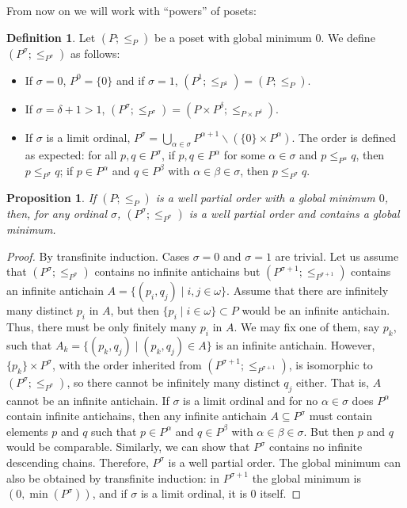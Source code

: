\documentclass[reqno]{amsart}
\newtheorem{proposition}[theorem]{Proposition}
\theoremstyle{definition}
\theoremstyle{definition}
\newtheorem{definition}[theorem]{Definition}
\theoremstyle{plain} %
\begin{document}
From now on we will work with ``powers'' of posets:
\begin{definition}\label{defpow}
    Let $(P;\leq_P)$ be a poset with global minimum $0$. We define $(P^\sigma;\leq_{P^\sigma})$ as follows:
    \begin{itemize}
        \item If $\sigma=0$, $P^0=\{0\}$ and if $\sigma=1$, $(P^1;\leq_{P^1})=(P;\leq_P)$.
        \item If $\sigma=\delta+1>1$, $(P^\sigma;\leq_{P^\sigma})=(P\times P^\delta;\leq_{P\times P^\delta})$.
        \item If $\sigma$ is a limit ordinal, $P^\sigma=\bigcup_{\alpha\in\sigma}P^{\alpha+1}\backslash(\{0\}\times P^\alpha)$. The order is defined as expected: for all $p,q\in P^\sigma$, if $p,q\in P^\alpha$ for some $\alpha\in\sigma$ and $p\leq_{P^\alpha}q $, then $p\leq_{P^\sigma}q$; if $p\in P^\alpha$ and $q\in P^\beta$ with $\alpha\in\beta\in\sigma$, then $p\leq_{P^\sigma}q$.
    \end{itemize}
\end{definition}
\begin{proposition}\label{profini}
    If \((P; \leq_P)\) is a well partial order with a global minimum $0$, then, for any ordinal \(\sigma\), \((P^\sigma; \leq_{P^\sigma})\) is a well partial order and contains a global minimum.
\end{proposition}
\begin{proof}
    By transfinite induction. Cases $\sigma=0$ and $\sigma=1$ are trivial. Let us assume that \((P^\sigma; \leq_{P^\sigma})\) contains no infinite antichains but \((P^{\sigma+1}; \leq_{P^{\sigma+1}})\) contains an infinite antichain $A=\{(p_i,q_j)\mid i,j\in\omega \}$. Assume that there are infinitely many distinct \(p_i\) in \(A\), but then \(\{p_i \mid i \in \omega\} \subset P\) would be an infinite antichain. Thus, there must be only finitely many \(p_i\) in \(A\). We may fix one of them, say \(p_k\), such that \(A_k = \{(p_k, q_j) \mid (p_k, q_j) \in A\}\) is an infinite antichain. However, \(\{p_k\} \times P^\sigma\), with the order inherited from \((P^{\sigma+1}; \leq_{P^{\sigma+1}})\), is isomorphic to \((P^{\sigma}; \leq_{P^{\sigma}})\), so there cannot be infinitely many distinct \(q_j\) either. That is, \(A\) cannot be an infinite antichain. If \(\sigma\) is a limit ordinal and for no \(\alpha \in \sigma\) does \(P^\alpha\) contain infinite antichains, then any infinite antichain \(A \subseteq P^\sigma\) must contain elements \(p\) and \(q\) such that \(p \in P^\alpha\) and \(q \in P^\beta\) with \(\alpha \in \beta \in \sigma\). But then \(p\) and \(q\) would be comparable. Similarly, we can show that \(P^\sigma\) contains no infinite descending chains. Therefore, \(P^\sigma\) is a well partial order. The global minimum can also be obtained by transfinite induction: in \(P^{\sigma+1}\) the global minimum is \((0, \min(P^\sigma))\), and if \(\sigma\) is a limit ordinal, it is \(0\) itself.
\end{proof}
\end{document}
